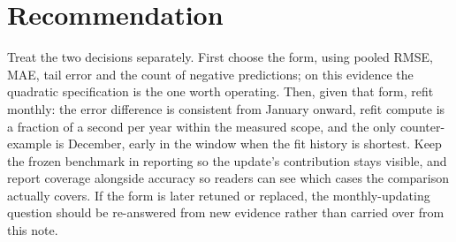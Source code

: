 \hypertarget{recommendation}{%
\section{Recommendation}\label{recommendation}}

Treat the two decisions separately. First choose the form, using pooled
RMSE, MAE, tail error and the count of negative predictions; on this
evidence the quadratic specification is the one worth operating. Then,
given that form, refit monthly: the error difference is consistent from
January onward, refit compute is a fraction of a second per year within
the measured scope, and the only counter-example is December, early in
the window when the fit history is shortest. Keep the frozen benchmark
in reporting so the update's contribution stays visible, and report
coverage alongside accuracy so readers can see which cases the
comparison actually covers. If the form is later retuned or replaced,
the monthly-updating question should be re-answered from new evidence
rather than carried over from this note.
